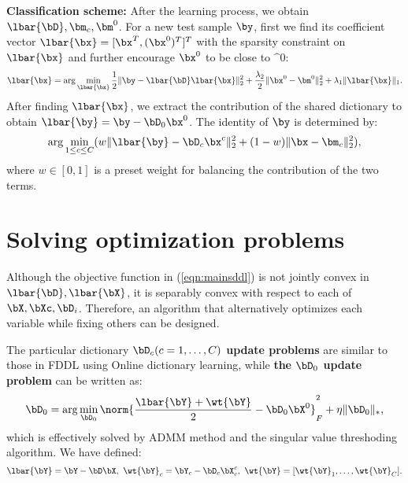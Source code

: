 \documentclass[letterpaper]{article}
\begin{document}
\noindent \textbf{Classification scheme:} After the learning process, we obtain $\lbar{\bD}, \bm_c, \bm^0$. For a new test sample $\by$, first we find its coefficient vector $\lbar{\bx} = [\bx^T, (\bx^0)^T]^T$ with the sparsity constraint on $\lbar{\bx}$ and further encourage $\bx^0$ to be close to $\bm^0$:
\begin{equation}
\label{eqn:findcodebarx}
    \lbar{\bx} = \arg\min_{\lbar{\bx}} \frac{1}{2}\|\by - \lbar{\bD}\lbar{\bx}\|_2^2 + \frac{\lambda_2}{2}\|\bx^0 - \bm^0\|_2^2 + \lambda_1\|\lbar{\bx}\|_1.
\end{equation}
After finding $\lbar{\bx}$, we extract the contribution of the shared dictionary to obtain $\lbar{\by} = \by - \bD_0\bx^0$. The identity of $\by$ is determined by:
\begin{equation}
    \arg\min_{1 \leq c \leq C} (w\|\lbar{\by} - \bD_c\bx^c\|_2^2 + (1-w)\|\bx - \bm_c\|_2^2),
\end{equation}
where $w \in [0,1]$ is a preset weight for balancing the contribution of the two terms.



\section{Solving optimization problems} %
\label{sub:solving_the_opt}
\par Although the objective function in (\ref{eqn:mainsddl}) is not jointly convex in $\lbar{\bD}, \lbar{\bX}$, it is separably convex with respect to each of $\bX, \bXc, \bD_i$. Therefore, an algorithm that alternatively optimizes each variable while fixing others can be designed. %
\par The particular dictionary {\bf $\bD_c (c = 1, \dots, C)$ update problems} are similar to those in FDDL\cite{Meng2011FDDL} using Online dictionary learning\cite{mairal2010online}, while {\bf the $\bD_0$ update problem} can be written as:
\begin{equation}
    \bD_0 = \arg\min_{\bD_0}  \norm{\frac{\lbar{\bY} + \wt{\bY}}{2} - \bD_0\bX^0}_F^2 + \eta\|\bD_0\|_*,
\end{equation}
which is effectively solved by ADMM\cite{boyd2011distributed} method and the singular value threshoding algorithm\cite{cai2010singular}. We have defined:
\begin{equation}
\label{eqn:defybarytilde}
 \lbar{\bY} = \bY - \bD\bX,~\wt{\bY}_c = \bY_c - \bD_c \bX_c^c,~\wt{\bY} = [\wt{\bY}_1, \dots, \wt{\bY}_C].
\end{equation}
\end{document}
